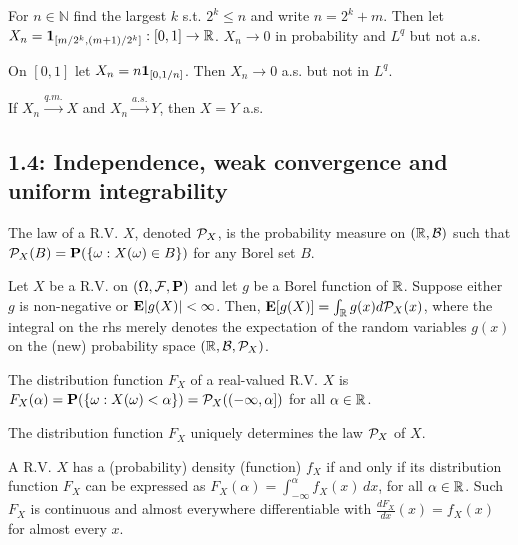 \begin{example*}
For $n \in \mathbb N$ find the largest $k$ s.t. $2^k \leq n$ and write $n = 2^k + m$. Then let $X_n = \mathbf{1}_{[m/2^k,(m+1)/2^k]} : [0,1]\to\mathbb R$. $X_n \to 0$ in probability and $L^q$ but not a.s.
\end{example*}

\begin{example*}
On $[0,1]$ let $X_n = n\mathbf{1}_{[0,1/n]}$. Then $X_n \to 0$ a.s. but not in $L^q$.
\end{example*}

\begin{proposition*} 
If $X_n \xrightarrow{q.m.} X$ and $X_n \xrightarrow{a.s.} Y$, then $X = Y$ a.s.
\end{proposition*} 

\subsection*{1.4: Independence, weak convergence and uniform integrability}

\begin{definition*} 
The law of a R.V. $X$, denoted $\mathcal{P}_X$, is the probability measure on $(\mathbb{R},
\mathcal{B})$ such that $\mathcal{P}_X(B) = \mathbf{P}(\{\omega: X(\omega) \in B\})$ for any Borel set
$B$.
\end{definition*} 

\begin{proposition*} 
Let $X$ be a R.V. on $(\Omega, \mathcal{F}, \mathbf{P})$ and let $g$ be a Borel function of
$\mathbb{R}$. Suppose either $g$ is non-negative or $\mathbf{E}|g(X)| < \infty$. Then,
$\mathbf{E}[g(X)] = \int_{\mathbb{R}} g(x) d\mathcal{P}_X(x)$, where the integral on the rhs merely
denotes the expectation of the random variables $g(x)$ on the (new) probability
space $(\mathbb{R}, \mathcal{B}, \mathcal{P}_X)$.
\end{proposition*} 

\begin{definition*} 
The distribution function $F_X$ of a real-valued R.V. $X$ is
$F_X(\alpha) = \mathbf{P}(\{\omega: X(\omega) < \alpha\}) = \mathcal{P}_X((-\infty, \alpha])$
for all $\alpha \in \mathbb{R}$.
\end{definition*} 

\begin{proposition*} 
The distribution function $F_X$ uniquely determines the law $\mathcal{P}_X$ of $X$.
\end{proposition*} 

\begin{proposition*} 
A R.V. $X$ has a (probability) density (function) $f_X$ if and only if its
distribution function $F_X$ can be expressed as $F_X(\alpha) =
\int_{-\infty}^\alpha f_X(x)\,dx$, for all $\alpha \in \mathbb{R}$. Such $F_X$ is
continuous and almost everywhere differentiable with $\frac{dF_X}{dx}(x) =
f_X(x)$ for almost every $x$.
\end{proposition*}

